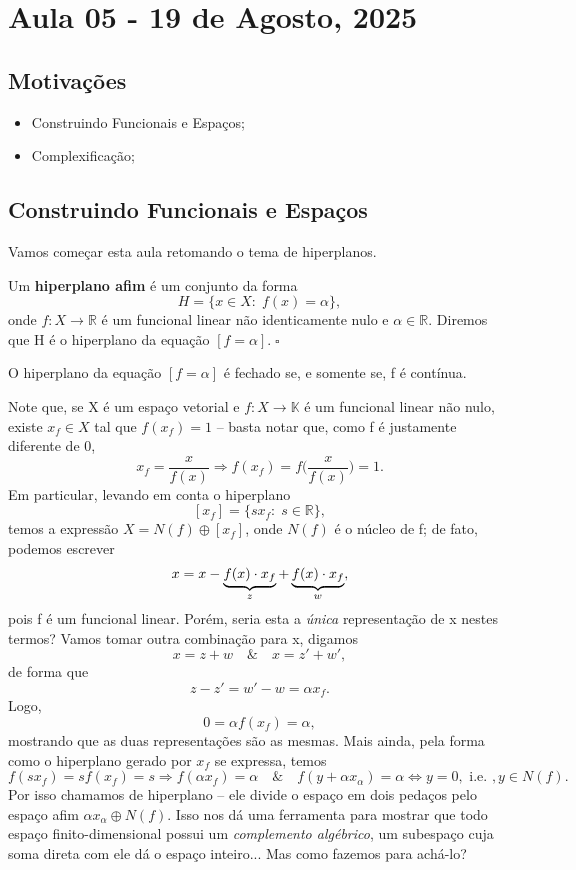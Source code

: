 \documentclass[../functional_analysis.tex]{subfiles}
\begin{document}
\section{Aula 05 - 19 de Agosto, 2025}
\subsection{Motivações}
\begin{itemize}
	\item Construindo Funcionais e Espaços;
	\item Complexificação;
\end{itemize}
\subsection{Construindo Funcionais e Espaços}

Vamos começar esta aula retomando o tema de hiperplanos.


\begin{def*}
	Um \textbf{hiperplano afim} é um conjunto da forma
	\[
		H=\{x\in X:\; f(x)=\alpha \},
	\]
	onde \(f:X\rightarrow \mathbb{R}\) é um funcional linear não identicamente nulo e \(\alpha \in \mathbb{R}.\) Diremos que H é o hiperplano da equação \([f=\alpha ].\; \square\)
\end{def*}

\begin{prop*}
	O hiperplano da equação \([f=\alpha ]\) é fechado se, e somente se, f é contínua.
\end{prop*}

Note que, se X é um espaço vetorial e \(f:X\rightarrow \mathbb{K}\) é um funcional linear não nulo, existe \(x_f\in X\) tal que \(f(x_f) = 1\) -- basta notar que, como f é justamente diferente de 0,
\[
	x_f = \frac{x}{f(x)} \Rightarrow f(x_f) = f \biggl(\frac{x}{f(x)}\biggr) = 1.
\]
Em particular, levando em conta o hiperplano
\[
	[x_f] = \{sx_f:\; s\in \mathbb{R}\},
\]
temos a expressão \(X = N(f)\oplus [x_f]\), onde \(N(f)\) é o núcleo de f; de fato, podemos escrever
\[
	x=x-\underbrace{f(x)\cdot x_f}_{\mathclap{z}} + \underbrace{f(x)\cdot x_f}_{\mathclap{w}},
\]
pois f é um funcional linear. Porém, seria esta a \textit{única} representação de x nestes termos? Vamos tomar outra combinação para x, digamos
\[
	x = z+w \quad\&\quad x = z'+w',
\]
de forma que
\[
	z-z' = w'-w = \alpha x_f.
\]
Logo,
\[
	0 = \alpha f(x_f) = \alpha ,
\]
mostrando que as duas representações são as mesmas. Mais ainda, pela forma como o hiperplano gerado por \(x_f\) se expressa, temos
\[
	f(sx_f) = sf(x_f) = s \Rightarrow f(\alpha x_f) = \alpha \quad\&\quad f(y+\alpha x_\alpha ) = \alpha \Longleftrightarrow y = 0, \text{ i.e. }, y\in N(f).
\]
Por isso chamamos de hiperplano -- ele divide o espaço em dois pedaços pelo espaço afim \(\alpha x_\alpha \oplus N(f).\) Isso nos dá uma ferramenta para mostrar que todo espaço finito-dimensional possui um \textit{complemento algébrico}, um subespaço cuja soma direta com ele dá o espaço inteiro... Mas como fazemos para achá-lo?
\end{document}
